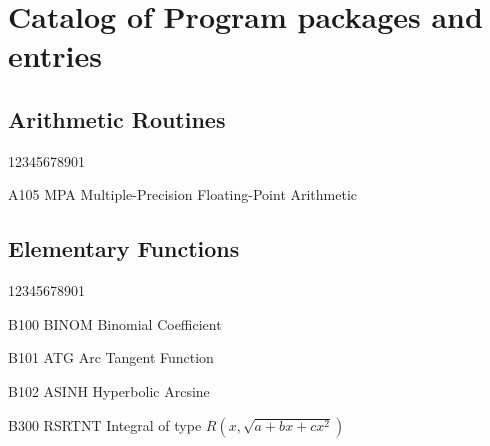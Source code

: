 \chapter{Catalog of Program packages and entries}
\section*{Arithmetic Routines}
\begin{DLtt}{12345678901}
\item[A105 MPA] Multiple-Precision Floating-Point Arithmetic
\end{DLtt}
\section*{Elementary Functions}
\begin{DLtt}{12345678901}
\item[B100 BINOM] Binomial Coefficient
\item[B101 ATG] Arc Tangent Function
\item[B102 ASINH] Hyperbolic Arcsine
\item[B300 RSRTNT] Integral of type $R(x,\sqrt{a+bx+cx^2})$
\end{DLtt}
